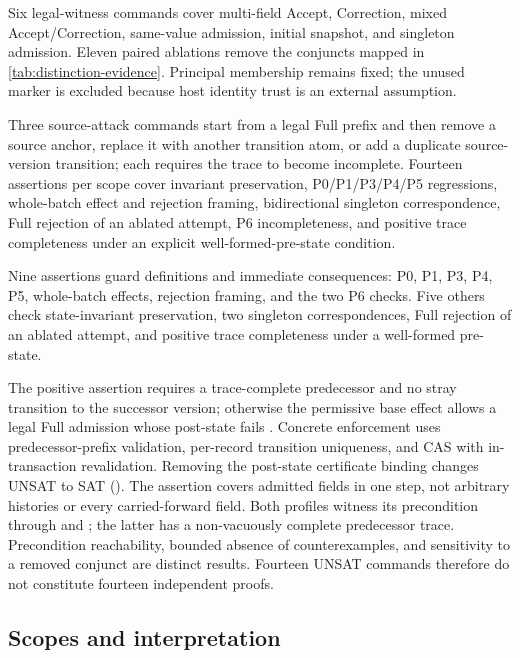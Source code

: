 Six legal-witness commands cover multi-field Accept, Correction, mixed Accept/Correction, same-value admission, initial snapshot, and singleton admission. Eleven paired ablations remove the conjuncts mapped in \cref{tab:distinction-evidence}. Principal membership remains fixed; the unused  marker is excluded because host identity trust is an external assumption.

Three source-attack commands start from a legal Full prefix and then remove a source anchor, replace it with another transition atom, or add a duplicate source-version transition; each requires the trace to become incomplete. Fourteen assertions per scope cover invariant preservation, P0/P1/P3/P4/P5 regressions, whole-batch effect and rejection framing, bidirectional singleton correspondence, Full rejection of an ablated attempt, P6 incompleteness, and positive trace completeness under an explicit well-formed-pre-state condition.

Nine assertions guard definitions and immediate consequences: P0, P1, P3, P4, P5, whole-batch effects, rejection framing, and the two P6 checks. Five others check state-invariant preservation, two singleton correspondences, Full rejection of an ablated attempt, and positive trace completeness under a well-formed pre-state.

The positive assertion requires a trace-complete predecessor and no stray transition to the successor version; otherwise the permissive base effect allows a legal Full admission whose post-state fails . Concrete enforcement uses predecessor-prefix validation, per-record transition uniqueness, and CAS with in-transaction revalidation. Removing the post-state certificate binding changes UNSAT to SAT (). The assertion covers admitted fields in one step, not arbitrary histories or every carried-forward field. Both profiles witness its precondition through  and ; the latter has a non-vacuously complete predecessor trace. Precondition reachability, bounded absence of counterexamples, and sensitivity to a removed conjunct are distinct results. Fourteen UNSAT commands therefore do not constitute fourteen independent proofs.

\subsection{Scopes and interpretation}

